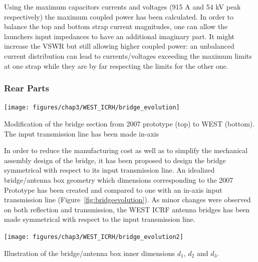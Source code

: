 {Using the maximum capacitors currents and voltages (915 A and 54 kV peak respectively) the maximum coupled power has been calculated. In order to balance the top and bottom strap current magnitudes, one can allow the launchers input impedances to have an additional imaginary part. It might increase the VSWR but still allowing higher coupled power: an unbalanced current distribution can lead to currents/voltages exceeding the maximum limits at one strap while they are by far respecting the limits for the other one. %




\subsubsection{Rear Parts}
\begin{marginfigure}
	\centering
	\texttt{[image: figures/chap3/WEST\_ICRH/bridge\_evolution]}
	\caption{Modification of the bridge section from 2007 prototype (top) to WEST (bottom). The input transmission line has been made in-axis}
	\label{fig:bridgeevolution}
\end{marginfigure}

In order to reduce the manufacturing cost as well as to simplify the mechanical assembly design of the bridge, it has been proposed to design the bridge symmetrical with respect to its input transmission line. An idealized bridge/antenna box geometry which dimensions corresponding to the 2007 Prototype has been created and compared to one with an in-axis input transmission line (Figure~\ref{fig:bridgeevolution}). As minor changes were observed on both reflection and transmission, the WEST ICRF antenna bridges has been made symmetrical with respect to the input transmission line.

\begin{marginfigure}
	\centering
	\texttt{[image: figures/chap3/WEST\_ICRH/bridge\_evolution2]}
	\caption{Illustration of the bridge/antenna box inner dimensions $d_1$, $d_2$ and $d_3$.}
	\label{fig:bridgeevolution2}
\end{marginfigure}

}
